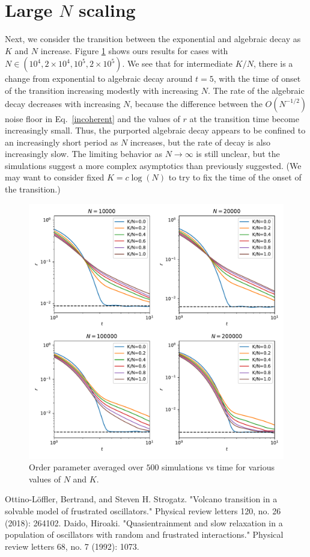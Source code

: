 \documentclass[aps,pre,amsmath,amssymb,floatfix,onecolumn,notitlepage,10pt]{revtex4-1}
\begin{document}
\section{Large $N$ scaling}
Next, we consider the transition between the exponential and algebraic decay as $K$ and $N$ increase. Figure \ref{fig3} shows ours results for cases with $N\in(10^4, 2\times 10^4, 10^5,2\times10^5)$. We see that for intermediate $K/N$, there is a change from exponential to algebraic decay around $t=5$, with the time of onset of the transition increasing modestly with increasing $N$.  The rate of the algebraic decay decreases with increasing $N$, because the difference between the $O(N^{-1/2})$ noise floor in Eq.~\eqref{incoherent} and the values of $r$ at the transition time become increasingly small. Thus, the purported algebraic decay appears to be confined to an increasingly short period as $N$ increases, but the rate of decay is also increasingly slow. The limiting behavior as $N\to\infty$ is still unclear, but the simulations suggest a more complex asymptotics than previously suggested. (We may want to consider fixed $K=c\log(N)$ to try to fix the time of the onset of the transition.)
\begin{figure}[hbt]
\includegraphics[width=0.75\columnwidth]{orders2.pdf}
\caption{Order parameter averaged over $500$ simulations vs time for various values of $N$ and $K$. \label{fig3}}
\end{figure}
\pagebreak

\begin{thebibliography}{99}
Ottino-L\"{o}ffler, Bertrand, and Steven H. Strogatz. "Volcano transition in a solvable model of frustrated oscillators." Physical review letters 120, no. 26 (2018): 264102.
Daido, Hiroaki. "Quasientrainment and slow relaxation in a population of oscillators with random and frustrated interactions." Physical review letters 68, no. 7 (1992): 1073.
\end{thebibliography}
\end{document}

